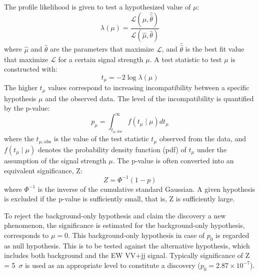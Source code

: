 The profile likelihood is given to test a hypothesized value of $\mu$:
\begin{equation}
\lambda(\mu) = \frac{\mathcal{L}\left(\mu, \hat{\hat{\theta}}\right)}{\mathcal{L}(\hat{\mu}, \hat{\theta})}
\end{equation}
where $\hat{\mu}$ and $\hat{\theta}$ are the parameters that maximize $\mathcal{L}$, and $\hat{\hat{\theta}}$ is the best fit value that maximize $\mathcal{L}$ for a certain signal strength $\mu$.
A test statistic to test $\mu$ is constructed with:
\begin{equation}
t_{\mu}= -2 \log \lambda (\mu)
\end{equation}
The higher $t_{\mu}$ values correspond to increasing incompatibility between a specific hypothesis $\mu$ and the observed data.
The level of the incompatibility is quantified by the p-value:
\begin{equation}
p_{\mu}=\int_{t_{\mu, \mathrm{obs}}}^{\infty} f\left(t_{\mu} \mid \mu\right) d t_{\mu}
\end{equation}
where the $t_{\mu, \mathrm{obs}}$ is the value of the test statistic $t_{\mu}$ observed from the data, and $f\left(t_{\mu} \mid \mu\right)$ denotes the probability density function (pdf) of $t_{\mu}$ under the assumption of the signal strength $\mu$.
%
The p-value is often converted into an equivalent significance, Z:
\begin{equation}
Z=\Phi^{-1}(1-p)
\end{equation}
where $\Phi^{-1}$ is the inverse of the cumulative standard Gaussian.
A given hypothesis is excluded if the p-value is sufficiently small, that is, Z is sufficiently large.

To reject the background-only hypothesis and claim the discovery a new phenomenon, the significance is estimated for the background-only hypothesis, corresponds to $\mu = 0$.
This background-only hypothesis in case of $p_0$ is regarded as null hypothesis. 
This is to be tested against the alternative hypothesis, which includes both background and the EW VV+jj signal.
Typically significance of Z = 5~$\sigma$ is used as an appropriate level to constitute a discovery ($p_0 = 2.87 \times 10^{-7}$). 


